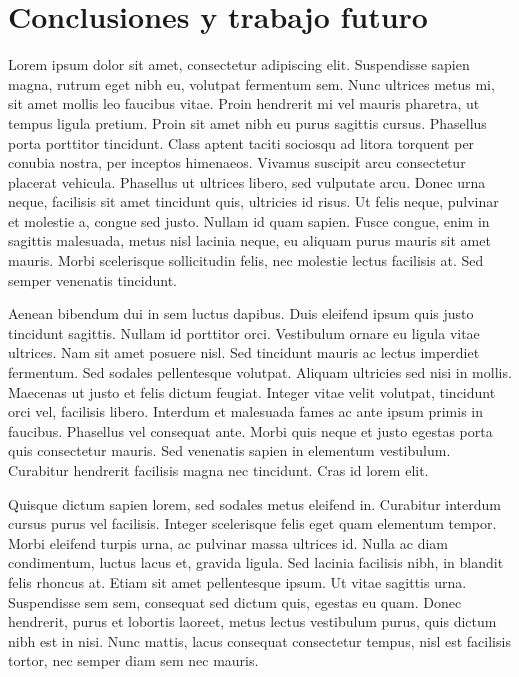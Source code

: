 \chapter{Conclusiones y trabajo futuro}\label{ch:Conclusiones}


Lorem ipsum dolor sit amet, consectetur adipiscing elit. Suspendisse sapien magna, rutrum eget nibh eu, volutpat fermentum sem. Nunc ultrices metus mi, sit amet mollis leo faucibus vitae. Proin hendrerit mi vel mauris pharetra, ut tempus ligula pretium. Proin sit amet nibh eu purus sagittis cursus. Phasellus porta porttitor tincidunt. Class aptent taciti sociosqu ad litora torquent per conubia nostra, per inceptos himenaeos. Vivamus suscipit arcu consectetur placerat vehicula. Phasellus ut ultrices libero, sed vulputate arcu. Donec urna neque, facilisis sit amet tincidunt quis, ultricies id risus. Ut felis neque, pulvinar et molestie a, congue sed justo. Nullam id quam sapien. Fusce congue, enim in sagittis malesuada, metus nisl lacinia neque, eu aliquam purus mauris sit amet mauris. Morbi scelerisque sollicitudin felis, nec molestie lectus facilisis at. Sed semper venenatis tincidunt.


Aenean bibendum dui in sem luctus dapibus. Duis eleifend ipsum quis justo tincidunt sagittis. Nullam id porttitor orci. Vestibulum ornare eu ligula vitae ultrices. Nam sit amet posuere nisl. Sed tincidunt mauris ac lectus imperdiet fermentum. Sed sodales pellentesque volutpat. Aliquam ultricies sed nisi in mollis. Maecenas ut justo et felis dictum feugiat. Integer vitae velit volutpat, tincidunt orci vel, facilisis libero. Interdum et malesuada fames ac ante ipsum primis in faucibus. Phasellus vel consequat ante. Morbi quis neque et justo egestas porta quis consectetur mauris. Sed venenatis sapien in elementum vestibulum. Curabitur hendrerit facilisis magna nec tincidunt. Cras id lorem elit.


Quisque dictum sapien lorem, sed sodales metus eleifend in. Curabitur interdum cursus purus vel facilisis. Integer scelerisque felis eget quam elementum tempor. Morbi eleifend turpis urna, ac pulvinar massa ultrices id. Nulla ac diam condimentum, luctus lacus et, gravida ligula. Sed lacinia facilisis nibh, in blandit felis rhoncus at. Etiam sit amet pellentesque ipsum. Ut vitae sagittis urna. Suspendisse sem sem, consequat sed dictum quis, egestas eu quam. Donec hendrerit, purus et lobortis laoreet, metus lectus vestibulum purus, quis dictum nibh est in nisi. Nunc mattis, lacus consequat consectetur tempus, nisl est facilisis tortor, nec semper diam sem nec mauris.


